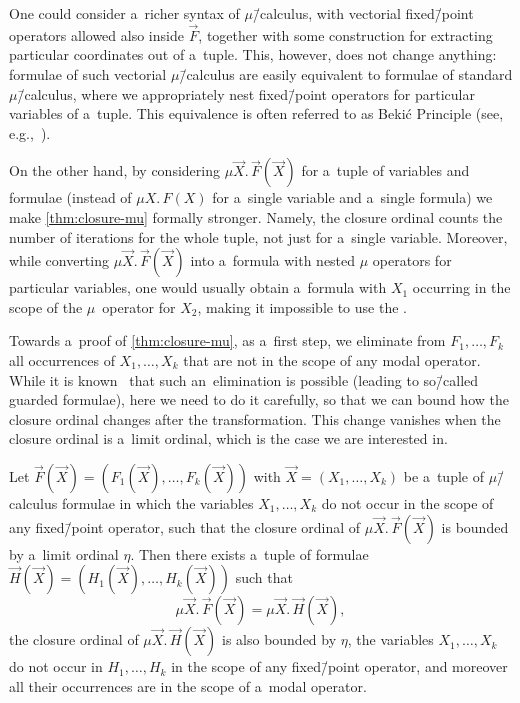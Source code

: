 \documentclass{lmcs}
\numberwithin{equation}{section}
\numberwithin{figure}{section}
\begin{document}
\begin{rem}
	One could consider a~richer syntax of $\mu$\=/calculus, with vectorial fixed\=/point operators allowed also inside $\vec{F}$, together with some construction for extracting particular coordinates out of a~tuple.
	This, however, does not change anything: formulae of such vectorial $\mu$\=/calculus are easily equivalent to formulae of standard $\mu$\=/calculus,
	where we appropriately nest fixed\=/point operators for particular variables of a~tuple. This equivalence is often referred to as Bekić Principle (see, e.g.,~\cite{Bekic1984}).

	On the other hand, by considering $\mu \vec{X}.\,\vec{F}(\vec{X})$ for a~tuple of variables and formulae (instead of $\mu X.\,F(X)$ for a~single variable and a~single formula)
	we make \cref{thm:closure-mu} formally stronger.
	Namely, the closure ordinal counts the number of iterations for the whole tuple, not just for a~single variable.
	Moreover, while converting $\mu \vec{X}.\,\vec{F}(\vec{X})$ into a~formula with nested $\mu$ operators for particular variables,
	one would usually obtain a~formula with $X_1$ occurring in the scope of the $\mu$~operator for $X_2$, making it impossible to use the .
\end{rem}

Towards a~proof of \cref{thm:closure-mu}, as a~first step, we eliminate from $F_1,\dots,F_k$ all occurrences of $X_1,\dots,X_k$ that are not in the scope of any modal operator.
While it is known~\cite{kozen-mu-calc} that such an~elimination is possible (leading to so\=/called guarded formulae), here we need to do it carefully,
so that we can bound how the closure ordinal changes after the transformation.
This change vanishes when the closure ordinal is a~limit ordinal, which is the case we are interested in.

\begin{lem}\label{lem:guarded}
	Let $\vec{F}(\vec{X})=(F_1(\vec{X}),\dots,F_k(\vec{X}))$ with $\vec{X}=(X_1,\dots,X_k)$ be a~tuple of $\mu$\=/calculus formulae in which the variables $X_1,\dots,X_k$ do not occur in the scope of any fixed\=/point operator,
	such that the closure ordinal of $\mu\vec{X}.\,\vec{F}(\vec{X})$ is bounded by a~limit ordinal $\eta$.
	Then there exists a~tuple of formulae $\vec{H}(\vec{X})=(H_1(\vec{X}),\dots,H_k(\vec{X}))$ such that
	\[
		\mu\vec{X}.\,\vec{F}(\vec{X}) = \mu\vec{X}.\,\vec{H}(\vec{X}),
	\]
	the closure ordinal of $\mu\vec{X}.\,\vec{H}(\vec{X})$ is also bounded by $\eta$,
	the variables $X_1,\dots,X_k$ do not occur in $H_1,\dots,H_k$ in the scope of any fixed\=/point operator,
	and moreover all their occurrences are in the scope of a~modal operator.
\end{lem}
\end{document}
